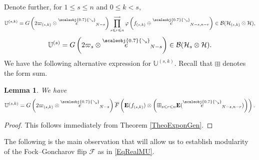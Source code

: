 \documentclass[11pt, reqno]{amsart}
\newtheorem{lemma}[theorem]{Lemma}
\theoremstyle{definition}
\numberwithin{equation}{section}
\def\longra{\longrightarrow}
\newcommand{\hr}[1]{\left(#1\right)}                                                    %
\def\le{\leqslant}
\def\Hc{\mathcal H}
\newcommand{\Bc}{\mathcal{B}}
\newcommand{\eb}{\mathbf{E}}
\newcommand{\Gauss}{G}
\newcommand{\bbU}{\mathbb{U}}
\newcommand{\Fct}{\mathcal{F}}
\newcommand{\sears}{\scaleobj{0.7}{\searrow}}
\newcommand{\seee}{\overset{\sears}{e}}
\begin{document}
Denote further, for $1\leq s\leq n$ and $0\leq k<s$,
\begin{equation}\label{EqPartFlipOne}
\bbU^{(s,k)} = \Gauss\left(2\varpi_{(s,k)} \otimes \seee_{N-s}\right)  \prod_{s \le r \le n}^{\longra}   \varphi\hr{f_{(s,k)}\oplus \seee_{N-s,n-r}} \in \Bc(\Hc_{(s,k)}\otimes \Hc), 
\end{equation}
\begin{equation}\label{EqPartFlipTwo}
\bbU^{(s)} =\Gauss\left(2\varpi_s \otimes \seee_{N-s}\right) \in  \Bc(\Hc_s\otimes \Hc). 
\end{equation}
We have the following alternative expression for  $\bbU^{(s,k)}$. Recall that $\boxplus$ denotes the form sum.  
\begin{lemma}
We have 
\begin{equation}\label{EqProdFormComp}
\bbU^{(s,k)} = \Gauss\left(2\varpi_{(s,k)} \otimes \seee_{N-s}\right)\overline{F}\hr{\eb(f_{(s,k)})\otimes  \left(\boxplus_{s \le r \le n} \eb(\seee_{N-s,n-r})\right)}.
\end{equation}
\end{lemma}
\begin{proof}
This follows immediately from Theorem \ref{TheoExponGen}. 
\end{proof}

The following is the main observation that will allow us to establish modularity of the Fock--Goncharov flip $\Fct$ as in  \eqref{EqRealMU}.
\end{document}
